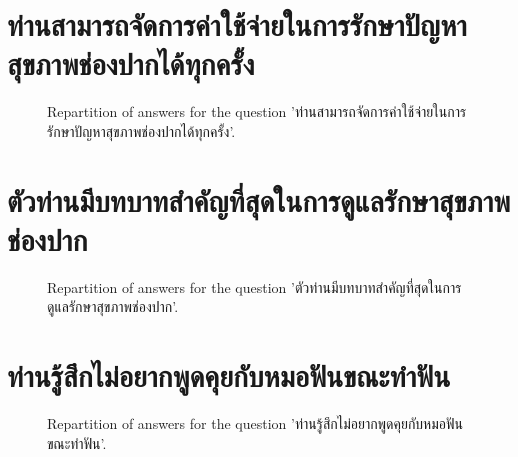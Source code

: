 \documentclass[12pt]{article}
\begin{document}
\clearpage{}
\section{ท่านสามารถจัดการค่าใช้จ่ายในการรักษาปัญหาสุขภาพช่องปากได้ทุกครั้ง}

\label{sec:90}


\begin{figure}[h!]
    \caption{\label{figure:q90-1}Repartition of answers for the question 'ท่านสามารถจัดการค่าใช้จ่ายในการรักษาปัญหาสุขภาพช่องปากได้ทุกครั้ง'.}
\end{figure}



\clearpage{}
\section{ตัวท่านมีบทบาทสำคัญที่สุดในการดูแลรักษาสุขภาพช่องปาก}

\label{sec:91}


\begin{figure}[h!]
    \caption{\label{figure:q91-1}Repartition of answers for the question 'ตัวท่านมีบทบาทสำคัญที่สุดในการดูแลรักษาสุขภาพช่องปาก'.}
\end{figure}



\clearpage{}
\section{ท่านรู้สึกไม่อยากพูดคุยกับหมอฟันขณะทำฟัน}

\label{sec:92}


\begin{figure}[h!]
    \caption{\label{figure:q92-1}Repartition of answers for the question 'ท่านรู้สึกไม่อยากพูดคุยกับหมอฟันขณะทำฟัน'.}
\end{figure}
\end{document}
